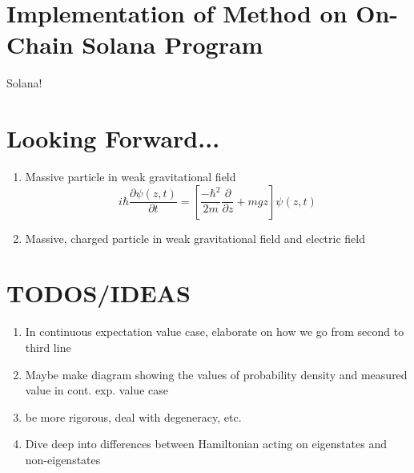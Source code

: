 \documentclass[12pt]{article}
\newcommand{\pd}[2]{\frac{\partial #1}{\partial #2}}
\begin{document}
\section{Implementation of Method on On-Chain Solana Program}
Solana!
\section{Looking Forward...}
\begin{enumerate}
    \item Massive particle in weak gravitational field
    \begin{equation*}
        i \hbar \pd{\psi(z,t)}{t} = \left[\frac{-\hbar^2}{2m}\pd{}{z} + mgz \right]\psi(z,t)
    \end{equation*}
    \item Massive, charged particle in weak gravitational field and electric field
\end{enumerate}

\section{TODOS/IDEAS}
\begin{enumerate}
    \item In continuous expectation value case, elaborate on how we go from second to third line
    \item Maybe make diagram showing the values of probability density and measured value in cont. exp. value case
    \item be more rigorous, deal with degeneracy, etc.
    \item Dive deep into differences between Hamiltonian acting on eigenstates and non-eigenstates
\end{enumerate}
\end{document}
